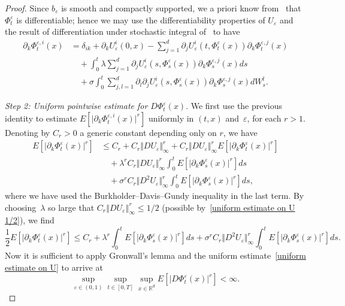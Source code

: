 \documentclass[a4paper,10pt]{article}
\newcommand\1{\mathbbm{1}}
\newcommand{\eps}{\varepsilon}
\numberwithin{equation}{section}
\begin{document}
\begin{proof}
Since $b_{\eps}$ is smooth and compactly supported, we a priori know from~\cite{KUNITA84} that $\Phi^{\eps}_t$ is differentiable; hence we may use the differentiability properties of $U_{\eps}$ and the result of differentiation under stochastic integral of~\cite{KUNITA84} to have
\begin{align}
\label{formula_Dvarphi}
\partial_{k}\Phi^{\eps,i}_{t}(x) & =\delta_{ik}+\partial_{k}U_{\eps}^{i}(0,x)  -\sum_{j=1}^{d} \partial_{j}U_{\eps}^{i}(t,\Phi^{\eps}_t(x)) 
\partial_{k}\Phi^{\eps,j}_{t}(x) \nonumber \\
& \quad +\int_{0}^{t}\lambda\sum_{j=1}^{d}\partial_{j}U_{\eps}^{i}(s,\Phi^{\eps}_s(x)) \partial_{k}\Phi^{\eps,j}_{s}(x) ds \nonumber \\
& \quad +\sigma\int_{0}^{t}\sum_{j,l=1}^{d}\partial_{l}\partial_{j}U_{\eps}^{i}(s,\Phi^{\eps}_s(x))  \partial_{k}\Phi^{\eps,j}_{s}(x)  dW_{s}^{l}. 
\end{align}

\emph{Step 2: Uniform pointwise estimate for $D\Phi^{\eps}_t(x)$}. We first use the previous identity to estimate $E[\vert \partial_{k}\Phi^{\eps,i}_{t}(x) \vert ^{r}]
$ uniformly in $(  t,x)  $ and~$\eps$, for each $r>1$. Denoting by $C_{r}>0$ a generic constant depending only on $r$, we have
\begin{align*}
E[ \vert \partial_{k}\Phi^{\eps}_{t}(x) \vert^{r}] & \leq C_{r}+C_{r} \Vert DU_{\varepsilon} \Vert_{\infty}^{r}+C_{r} \Vert DU_{\varepsilon} \Vert
_{\infty}^{r} E [ \vert \partial_{k}\Phi^{\eps}_{t}(x) \vert^{r} ]  \\
 & \quad +\lambda^{r}C_{r} \Vert DU_{\varepsilon} \Vert _{\infty}^{r}
\int_{0}^{t}E [ \vert \partial_{k}\Phi^{\eps}_{s}(x) \vert^{r}]  ds \\
 & \quad +\sigma^{r}C_{r} \Vert D^{2}U_{\varepsilon} \Vert _{\infty}^{r}
\int_{0}^{t} E[ \vert \partial_{k}\Phi^{\eps}_{s}(x) \vert^{r}]  ds ,
\end{align*}
where we have used the Burkholder--Davis--Gundy inequality in the last term. By choosing~$\lambda$ so large that $C_{r}\left\Vert DU_{\varepsilon}\right\Vert _{\infty}^{r}\leq 1/2$ (possible by~\eqref{uniform estimate on U 1/2}), we find
\begin{equation*}
\frac{1}{2} E[ \vert \partial_{k}\Phi^{\eps}_{t}(x) \vert^{r}] \leq C_{r} 
 +\lambda^{r} \int_{0}^{t}E [ \vert \partial_{k}\Phi^{\eps}_{s}(x) \vert^{r}] ds
 +\sigma^{r} C_{r} \Vert D^{2}U_{\varepsilon}\Vert _{\infty}^{r}
\int_{0}^{t} E[ \vert \partial_{k}\Phi^{\eps}_{s}(x) \vert^{r} ]  ds .
\end{equation*}
Now it is sufficient to apply Gronwall's lemma and the uniform estimate~\eqref{uniform estimate on U} to arrive at
\begin{equation}
\sup_{\eps\in (0,1)  }\sup_{t\in [0,T]  } 
\sup_{x\in\mathbb{R}^{d}}E [ \vert D\Phi^{\eps}_{t}(x) \vert^{r}] <\infty .\label{uniform estimate on phi} 
\end{equation}


\end{proof}
\end{document}

